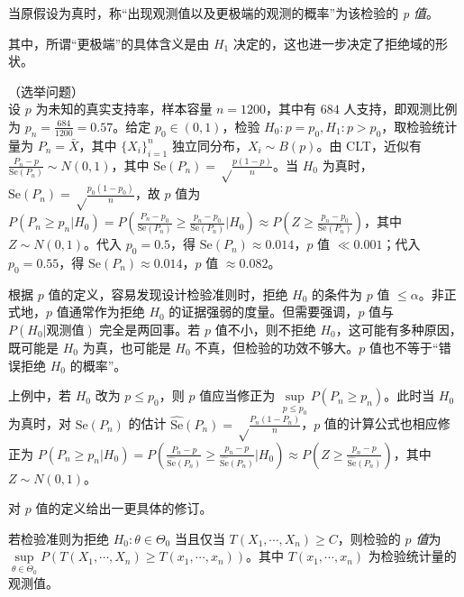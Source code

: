 \documentclass[../main.tex]{subfiles}
\begin{document}
\begin{definition}\label{def:7.4.1}
    当原假设为真时，称“出现观测值以及更极端的观测的概率”为该检验的 \emph{p 值}。
\end{definition}

其中，所谓“更极端”的具体含义是由 $H_1$ 决定的，这也进一步决定了拒绝域的形状。

\begin{example}
    （选举问题）\\
    设 $p$ 为未知的真实支持率，样本容量 $n=1200$，其中有 $684$ 人支持，即观测比例为 $p_n=\frac{684}{1200}=0.57$。给定 $p_0\in(0,1)$，检验 $H_0:p=p_0,H_1:p>p_0$，取检验统计量为 $P_n=\bar X$，其中 $\{X_i\}_{i=1}^n$ 独立同分布，$X_i\sim B(p)$。由 CLT，近似有 $\frac{P_n-p}{\mathrm{Se}(P_n)}\sim N(0,1)$，其中 $\mathrm{Se}(P_n)=\sqrt\frac{p(1-p)}n$。当 $H_0$ 为真时，$\mathrm{Se}(P_n)=\sqrt\frac{p_0(1-p_0)}n$，故 $p$ 值为 $P(P_n\geq p_n|H_0)=P(\frac{P_n-p_0}{\mathrm{Se}(P_n)}\geq\frac{p_n-p_0}{\mathrm{Se}(P_n)}|H_0)\approx P(Z\geq\frac{p_n-p_0}{\mathrm{Se}(P_n)})$，其中 $Z\sim N(0,1)$。代入 $p_0=0.5$，得 $\mathrm{Se}(P_n)\approx0.014$，$p$ 值 $\ll0.001$；代入 $p_0=0.55$，得 $\mathrm{Se}(P_n)\approx0.014$，$p$ 值 $\approx0.082$。
\end{example}

根据 $p$ 值的定义，容易发现设计检验准则时，拒绝 $H_0$ 的条件为 $p$ 值 $\leq\alpha$。非正式地，$p$ 值通常作为拒绝 $H_0$ 的证据强弱的度量。但需要强调，$p$ 值与 $P(H_0|\text{观测值})$ 完全是两回事。若 $p$ 值不小，则不拒绝 $H_0$，这可能有多种原因，既可能是 $H_0$ 为真，也可能是 $H_0$ 不真，但检验的功效不够大。$p$ 值也不等于“错误拒绝 $H_0$ 的概率”。

上例中，若 $H_0$ 改为 $p\leq p_0$，则 $p$ 值应当修正为 $\sup\limits_{p\leq p_0}P(P_n\geq p_n)$。此时当 $H_0$ 为真时，对 $\mathrm{Se}(P_n)$ 的估计 $\widehat{\mathrm{Se}}(P_n)=\sqrt\frac{P_n(1-P_n)}n$，$p$ 值的计算公式也相应修正为 $P(P_n\geq p_n|H_0)=P(\frac{P_n-p}{\widehat{\mathrm{Se}}(P_n)}\geq\frac{p_n-p}{\widehat{\mathrm{Se}}(P_n)}|H_0)\approx P(Z\geq\frac{p_n-p}{\widehat{\mathrm{Se}}(P_n)})$，其中 $Z\sim N(0,1)$。

对 $p$ 值的定义给出一更具体的修订。

\begin{definition}\label{def:7.4.2}
    若检验准则为拒绝 $H_0:\theta\in\Theta_0$ 当且仅当 $T(X_1,\cdots,X_n)\geq C$，则检验的 \emph{$p$ 值}为 $\sup\limits_{\theta\in\Theta_0}P(T(X_1,\cdots,X_n)\geq T(x_1,\cdots,x_n))$。其中 $T(x_1,\cdots,x_n)$ 为检验统计量的观测值。
\end{definition}
\end{document}
